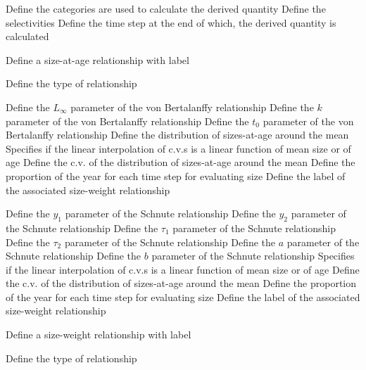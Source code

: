 \par\textbf{}\par
{} {Define the categories are used to calculate the derived quantity}
 {Define the selectivities}
 {Define the time step at the end of which, the derived quantity is calculated}
\par {} {Define a size-at-age relationship with label}\par
{} {Define the type of relationship}
\par\textbf{}\par
{} {Define the $L_\infty$ parameter of the von Bertalanffy relationship}
 {Define the $k$ parameter of the von Bertalanffy relationship}
 {Define the $t_0$ parameter of the von Bertalanffy relationship}
 {Define the distribution of sizes-at-age around the mean}
 {Specifies if the linear interpolation of c.v.s is a linear function of mean size or of age}
 {Define the c.v. of the distribution of sizes-at-age around the mean}
 {Define the proportion of the year for each time step for evaluating size}
 {Define the label of the associated size-weight relationship}
\par\textbf{}\par
{} {Define the $y_1$ parameter of the Schnute relationship}
 {Define the $y_2$ parameter of the Schnute relationship}
 {Define the $\tau_1$ parameter of the Schnute relationship}
 {Define the $\tau_2$ parameter of the Schnute relationship}
 {Define the $a$ parameter of the Schnute relationship}
 {Define the $b$ parameter of the Schnute relationship}
 {Specifies if the linear interpolation of c.v.s is a linear function of mean size or of age}
 {Define the c.v. of the distribution of sizes-at-age around the mean}
 {Define the proportion of the year for each time step for evaluating size}
 {Define the label of the associated size-weight relationship}
\par {} {Define a size-weight relationship with label}\par
{} {Define the type of relationship}
\par\textbf{}\par
